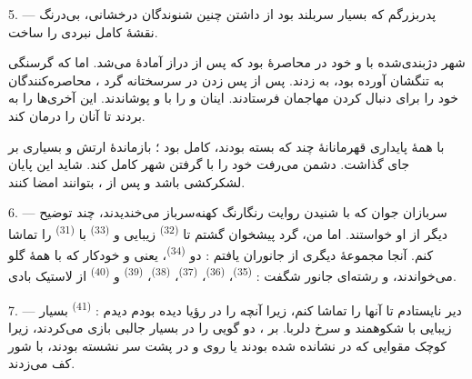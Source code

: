 5. --- پدربزرگم که بسیار سربلند بود از داشتن چنین شنوندگان درخشانی،
بی‌درنگ نقشهٔ کامل نبردی را ساخت.

شهر دژبندی‌شده با  و  خود در محاصرهٔ
 بود که پس از  دراز آمادهٔ
 می‌شد. اما  که گرسنگی به تنگشان
آورده بود،  به  
زدند. پس از پس زدن  در  سرسختانه گرد
، محاصره‌کنندگان   خود
را برای دنبال کردن مهاجمان  فرستادند. اینان
 و  را با  و
 پوشاندند.  این آخری‌ها را به
 بردند تا  آنان را درمان کند.

با همهٔ پایداری قهرمانانهٔ چند  که 
بسته بودند،  کامل بود ؛ بازماندهٔ ارتش  و
 بسیاری بر جای گذاشت. دشمن می‌رفت  خود را
با گرفتن شهر کامل کند. شاید این پایان لشکرکشی باشد و پس از
، بتوانند  امضا کنند.

\VUsaut{4.4mm}
\VUsaut{2.8mm}

6. --- سربازان جوان که با شنیدن روایت رنگارنگ کهنه‌سرباز می‌خندیدند،
چند توضیح دیگر از او خواستند. اما من، گرد پیشخوان گشتم تا
 \textsuperscript{(32)} زیبایی و 
\textsuperscript{(33)} با  \textsuperscript{(31)} را
تماشا کنم. آنجا مجموعهٔ دیگری از جانوران یافتم : دو  \textsuperscript{(34)}، یعنی  و
 خودکار که با همهٔ گلو می‌خواندند، و رشته‌ای جانور شگفت :
 \textsuperscript{(35)}، 
\textsuperscript{(36)}،  \textsuperscript{(37)}،
 \textsuperscript{(38)}، 
\textsuperscript{(39)} و  \textsuperscript{(40)} از لاستیک
بادی.

7. --- دیر نایستادم تا آنها را تماشا کنم، زیرا آنچه را در رؤیا دیده
بودم دیدم :  \textsuperscript{(41)} بسیار زیبایی با
 شکوهمند و  سرخ دلربا. بر
، دو  گویی  را در
 بسیار جالبی بازی می‌کردند، زیرا 
کوچک مقوایی که در  نشانده شده بودند یا روی
 و در  پشت سر
 نشسته بودند، با شور کف می‌زدند.

